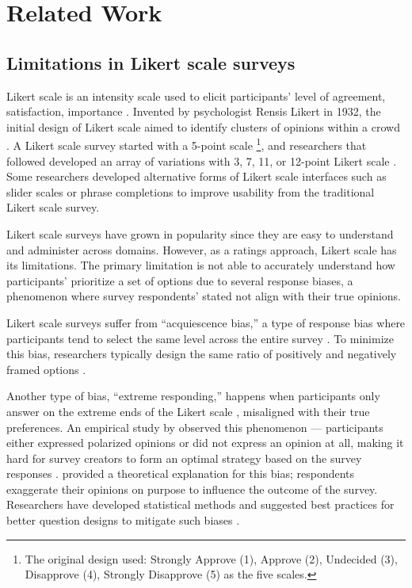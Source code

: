 \section{Related Work} \label{related_works}

\subsection{Limitations in Likert scale surveys}
Likert scale is an intensity scale used to elicit participants' level of agreement, satisfaction, {} importance \cite{likert1932technique}. Invented by psychologist Rensis Likert in 1932, the initial design of Likert scale aimed to identify clusters of opinions within a crowd \cite{joshi2015likert}. A Likert scale survey started with a 5-point scale \footnote{The original design used: Strongly Approve (1), Approve (2), Undecided (3), Disapprove (4), Strongly Disapprove (5) as the five scales.}, and researchers that followed developed an array of variations with 3, 7, 11, or 12-point Likert scale \cite{garland2008computer,finstad2010}. Some researchers developed alternative forms of Likert scale interfaces such as slider scales \cite{roster2015exploring} or phrase completions \cite{hodge2003phrase} to improve usability from the traditional Likert scale survey. 

Likert scale surveys have grown in popularity since they are easy to understand and administer across domains. However, as a ratings approach, Likert scale has its limitations. The primary limitation is not able to accurately understand how participants' prioritize a set of options due to several response biases, a phenomenon where survey respondents' stated {} not align with their true opinions. 

Likert scale surveys suffer from ``acquiescence bias,'' a type of response bias where participants tend to select the same level across the entire survey \cite{alwin1985measurement, moors2016two}. To minimize this bias, researchers typically design the same ratio of positively and negatively framed options \cite{kuru2016improving}. 

Another type of bias, ``extreme responding,'' happens when participants only answer on the extreme ends of the Likert scale \cite{batchelor2016extreme, furnham1986response, meisenberg2008acquiescent}, misaligned with their true preferences. An empirical study by \textcite{quarfoot2017quadratic} observed this phenomenon --- participants either expressed polarized opinions or did not express an opinion at all, making it hard for survey creators to form an optimal strategy based on the survey responses \cite{posner2018radical}. \textcite{cavaille2018towards} provided a theoretical explanation for this bias; respondents exaggerate their opinions on purpose to influence the outcome of the survey. Researchers have developed statistical methods and suggested best practices for better question designs to mitigate such biases \cite{glaser2008response}.

